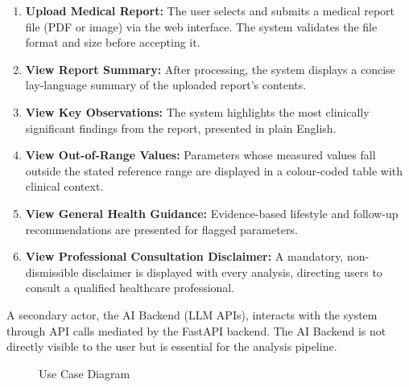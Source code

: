 \begin{enumerate}
    \item \textbf{Upload Medical Report:} The user selects and submits a medical report file (PDF or image) via the web interface. The system validates the file format and size before accepting it.
    \item \textbf{View Report Summary:} After processing, the system displays a concise lay-language summary of the uploaded report's contents.
    \item \textbf{View Key Observations:} The system highlights the most clinically significant findings from the report, presented in plain English.
    \item \textbf{View Out-of-Range Values:} Parameters whose measured values fall outside the stated reference range are displayed in a colour-coded table with clinical context.
    \item \textbf{View General Health Guidance:} Evidence-based lifestyle and follow-up recommendations are presented for flagged parameters.
    \item \textbf{View Professional Consultation Disclaimer:} A mandatory, non-dismissible disclaimer is displayed with every analysis, directing users to consult a qualified healthcare professional.
\end{enumerate}

A secondary actor, the AI Backend (LLM APIs), interacts with the system through API calls mediated by the FastAPI backend. The AI Backend is not directly visible to the user but is essential for the analysis pipeline.

\begin{figure}[h]
    \centering
    \caption{Use Case Diagram}
\end{figure}

